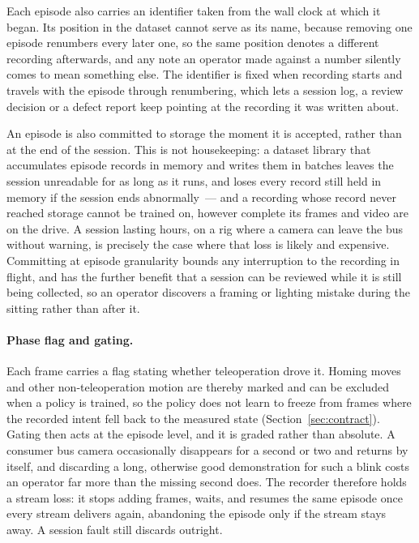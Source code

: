 Each episode also carries an identifier taken from the wall clock at which it
began. Its position in the dataset cannot serve as its name, because removing
one episode renumbers every later one, so the same position denotes a different
recording afterwards, and any note an operator made against a number silently
comes to mean something else. The identifier is fixed when recording starts and
travels with the episode through renumbering, which lets a session log, a
review decision or a defect report keep pointing at the recording it was
written about.

An episode is also committed to storage the moment it is accepted, rather than
at the end of the session. This is not housekeeping: a dataset library that
accumulates episode records in memory and writes them in batches leaves the
session unreadable for as long as it runs, and loses every record still held in
memory if the session ends abnormally~--- and a recording whose record never
reached storage cannot be trained on, however complete its frames and video are
on the drive. A session lasting hours, on a rig where a camera can leave the bus
without warning, is precisely the case where that loss is likely and expensive.
Committing at episode granularity bounds any interruption to the recording in
flight, and has the further benefit that a session can be reviewed while it is
still being collected, so an operator discovers a framing or lighting mistake
during the sitting rather than after it.

\paragraph{Phase flag and gating.} Each frame carries a flag stating
whether teleoperation drove it. Homing moves and other non-teleoperation
motion are thereby marked and can be excluded when a policy is trained, so
the policy does not learn to freeze from frames where the recorded intent
fell back to the measured state (Section~\ref{sec:contract}). Gating then acts
at the episode level, and it is graded rather than absolute. A consumer bus
camera occasionally disappears for a second or two and returns by itself, and
discarding a long, otherwise good demonstration for such a blink costs an
operator far more than the missing second does. The recorder therefore holds a
stream loss: it stops adding frames, waits, and resumes the same episode once
every stream delivers again, abandoning the episode only if the stream stays
away. A session fault still discards outright.

